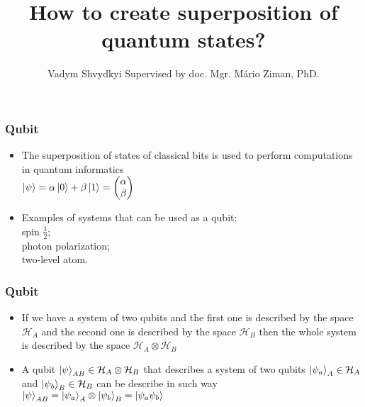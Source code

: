 \documentclass{beamer}%
\title{How to create superposition of quantum states?}
\author{Vadym Shvydkyi Supervised by doc. Mgr. Mário Ziman, PhD.}
\institute{Comenius University in Bratislava}
\begin{document}
	
	\begin{frame}%
		\titlepage
	\end{frame}
	
	\begin{frame}
		\frametitle{Qubit}
		\begin{itemize}\itemsep=2ex
			\item The superposition of states of classical bits is used to perform computations in quantum informatics\\
			$\ket{\psi} = \alpha \ket{0} + \beta \ket{1} = \begin{pmatrix} {\alpha} \\ {\beta } \end{pmatrix}$
			\item Examples of systems that can be used as a qubit: \\ spin $\frac{1}{2}$;\\ photon polarization; \\ two-level atom.
		\end{itemize}

	\end{frame}
	\begin{frame}
		\frametitle{Qubit}

		\begin{itemize}
			\item If we have a system of two qubits and the first one is described by the space $\mathcal{H}_A$ and the second one is described by the space $\mathcal{H}_B$ then the whole system is described by the space $\mathcal{H}_A \otimes \mathcal{H}_B$ 
			\item A qubit $\ket{\psi}_{AB} \in \mathcal{H}_A \otimes \mathcal{H}_B$ that describes a system of two qubits $\ket{\psi_a}_A \in \mathcal{H}_A$ and $\ket{\psi_b}_B \in \mathcal{H}_B$ can be describe in such way $\ket{\psi}_{AB} = \ket{\psi_a}_A \otimes \ket{\psi_b}_B = \ket{\psi_a \psi_b}$
		\end{itemize}
	\end{frame}
	
\end{document}
